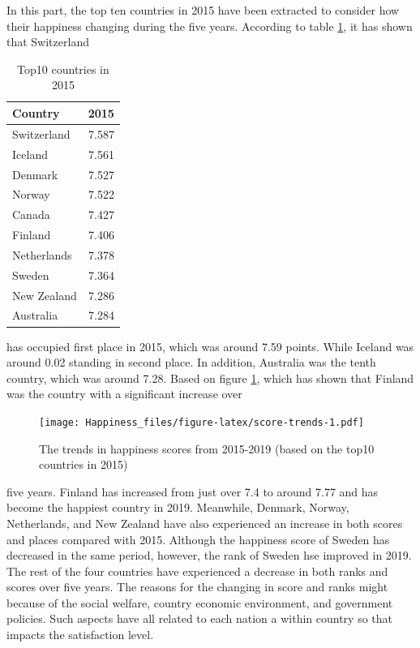 \documentclass[11pt,a4paper,]{article}
\begin{document}
In this part, the top ten countries in 2015 have been extracted to consider how their happiness changing during the five years. According to table \ref{tab:top10-countries-2015}, it has shown that Switzerland

\begin{table}

\caption{\label{tab:top10-countries-2015}Top10 countries in 2015}
\centering
\begin{tabular}[t]{l|r}
\hline
Country & 2015\\
\hline
Switzerland & 7.587\\
\hline
Iceland & 7.561\\
\hline
Denmark & 7.527\\
\hline
Norway & 7.522\\
\hline
Canada & 7.427\\
\hline
Finland & 7.406\\
\hline
Netherlands & 7.378\\
\hline
Sweden & 7.364\\
\hline
New Zealand & 7.286\\
\hline
Australia & 7.284\\
\hline
\end{tabular}
\end{table}

has occupied first place in 2015, which was around 7.59 points. While Iceland was around 0.02 standing in second place. In addition, Australia was the tenth country, which was around 7.28. Based on figure \ref{fig:score-trends}, which has shown that Finland was the country with a significant increase over

\begin{figure}
\centering
\texttt{[image: Happiness\_files/figure-latex/score-trends-1.pdf]}
\caption{\label{fig:score-trends}The trends in happiness scores from 2015-2019 (based on the top10 countries in 2015)}
\end{figure}

five years. Finland has increased from just over 7.4 to around 7.77 and has become the happiest country in 2019. Meanwhile, Denmark, Norway, Netherlands, and New Zealand have also experienced an increase in both scores and places compared with 2015. Although the happiness score of Sweden has decreased in the same period, however, the rank of Sweden hse improved in 2019. The rest of the four countries have experienced a decrease in both ranks and scores over five years. The reasons for the changing in score and ranks might because of the social welfare, country economic environment, and government policies. Such aspects have all related to each nation a within country so that impacts the satisfaction level.
\end{document}
